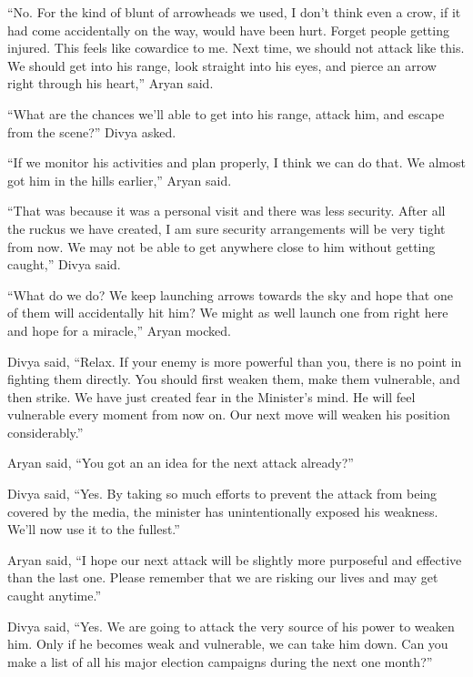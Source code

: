 “No. For the kind of blunt of arrowheads we used, I don't think even a crow, if
it had come accidentally on the way, would have been hurt. Forget people getting
injured. This feels like cowardice to me. Next time, we should not attack like
this. We should get into his range, look straight into his eyes, and pierce an
arrow right through his heart,” Aryan said.

“What are the chances we'll able to get into his range, attack him, and escape
from the scene?” Divya asked.

“If we monitor his activities and plan properly, I think we can do that. We
almost got him in the hills earlier,” Aryan said.

“That was because it was a personal visit and there was less security. After all
the ruckus we have created, I am sure security arrangements will be very tight
from now. We may not be able to get anywhere close to him without getting
caught,” Divya said.

“What do we do? We keep launching arrows towards the sky and hope that one of
them will accidentally hit him? We might as well launch one from right here and
hope for a miracle,” Aryan mocked.

Divya said, “Relax. If your enemy is more powerful than you, there is no point
in fighting them directly. You should first weaken them, make them vulnerable,
and then strike. We have just created fear in the Minister's mind. He will
feel vulnerable every moment from now on. Our next move will weaken his position
considerably.”

Aryan said, “You got an an idea for the next attack already?”

Divya said, “Yes. By taking so much efforts to prevent the attack from being
covered by the media, the minister has unintentionally exposed his weakness.
We'll now use it to the fullest.”

Aryan said, “I hope our next attack will be slightly more purposeful and
effective than the last one. Please remember that we are risking our lives and
may get caught anytime.”

Divya said, “Yes. We are going to attack the very source of his power to weaken
him. Only if he becomes weak and vulnerable, we can take him down. Can you make
a list of all his major election campaigns during the next one month?”